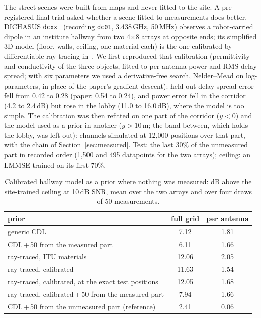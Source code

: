 \documentclass[11pt]{article}
\begin{document}
The street scenes were built from maps and never fitted to the site. A
pre-registered final trial asked whether a scene fitted to measurements does
better. DICHASUS \texttt{dcxx}~\cite{dichasushallway} (recording
\texttt{dc01}, 3.438\,GHz, 50\,MHz) observes a robot-carried dipole in an
institute hallway from two 4$\times$8 arrays at opposite ends; its simplified
3D model (floor, walls, ceiling, one material each) is the one calibrated by
differentiable ray tracing in~\cite{hoydis2023learning}. We first reproduced
that calibration (permittivity and conductivity of the three objects, fitted to
per-antenna power and RMS delay spread; with six parameters we used a
derivative-free search, Nelder--Mead on log-parameters, in place of the paper's
gradient descent): held-out delay-spread error fell from
0.42 to 0.28 (paper: 0.54 to 0.24), and power error fell in the corridor
(4.2 to 2.4\,dB) but rose in the lobby (11.0 to 16.0\,dB), where the model is
too simple. The calibration was then refitted on one part of the corridor
($y<0$) and the model used as a prior in another ($y>10$\,m; the band between,
which holds the lobby, was left out): channels simulated at 12{,}000 positions over that
part, with the chain of Section~\ref{sec:measured}. Test: the last 30\% of the
unmeasured part in recorded order (1{,}500 and 495 datapoints for the two
arrays); ceiling: an LMMSE trained on its first 70\%.

\begin{table}[!htb]
\centering
\footnotesize
\begin{tabular}{lcc}
\toprule
prior & full grid & per antenna \\
\midrule
generic CDL & 7.12 & 1.81 \\
CDL\,+\,50 from the measured part & 6.11 & 1.66 \\
ray-traced, ITU materials & 12.06 & 2.05 \\
ray-traced, calibrated & 11.63 & 1.54 \\
ray-traced, calibrated, at the exact test positions & 12.05 & 1.68 \\
ray-traced, calibrated\,+\,50 from the measured part & 7.94 & 1.66 \\
CDL\,+\,50 from the unmeasured part (reference) & 2.41 & 0.06 \\
\bottomrule
\end{tabular}
\caption{Calibrated hallway model as a prior where nothing was measured: dB
above the site-trained ceiling at 10\,dB SNR, mean over the two arrays and
over four draws of 50 measurements.}
\label{tab:hallway}
\end{table}
\end{document}
